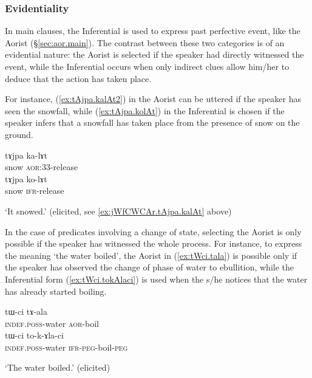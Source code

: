 \subsubsection{Evidentiality}   \label{sec:ifr.evd}
In main clauses, the Inferential is used to express past perfective event, like the Aorist (§\ref{sec:aor.main}). The contrast between these two categories is of an evidential nature: the Aorist is selected if the speaker had directly witnessed the event, while the Inferential occurs when only indirect clues allow him/her to deduce that the action has taken place.

For instance, (\ref{ex:tAjpa.kalAt2}) in the Aorist can be uttered if the speaker has seen the snowfall, while (\ref{ex:tAjpa.kolAt}) in the Inferential is chosen if the speaker infers that a snowfall has taken place from the presence of snow on the ground.

\begin{exe}
\ex 
\begin{xlist}
\ex \label{ex:tAjpa.kalAt2}
\gll tɤjpa ka-lɤt \\
snow \textsc{aor}:3\fl{}3-release \\
\ex \label{ex:tAjpa.kolAt}
\gll tɤjpa ko-lɤt \\
snow \textsc{ifr}-release \\
\end{xlist}
\glt `It snowed.' (elicited, see \ref{ex:jWfCWCAr.tAjpa.kalAt} above)
\end{exe}

In the case of predicates involving a change of state, selecting the Aorist is only possible if the speaker has witnessed the whole process. For instance, to express the meaning `the water boiled', the Aorist in (\ref{ex:tWci.tala}) is possible only if the speaker has observed the change of phase of water to ebullition, while the Inferential form (\ref{ex:tWci.tokAlaci}) is used when the s/he notices that the water has already started boiling.

\begin{exe}
\ex 
\begin{xlist}
\ex \label{ex:tWci.tala}
\gll tɯ-ci tɤ-ala \\
\textsc{indef}.\textsc{poss}-water \textsc{aor}-boil  \\
\ex \label{ex:tWci.tokAlaci}
\gll tɯ-ci to-k-ɤla-ci  \\
\textsc{indef}.\textsc{poss}-water \textsc{ifr}-\textsc{peg}-boil-\textsc{peg} \\
\end{xlist}
\glt `The water boiled.' (elicited)
\end{exe}

